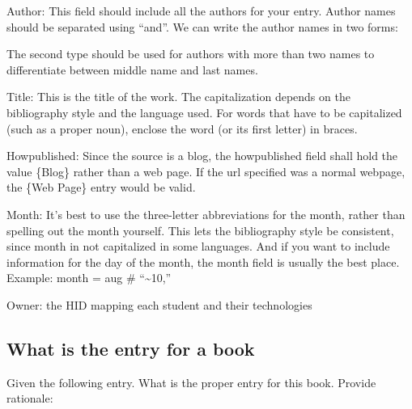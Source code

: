 Author:
This field should include all the authors for your entry. Author names
should be separated using “and”. We can write the author names in two
forms:

\begin{sphinxVerbatim}[commandchars=\\\{\}]
       
                
       
                
\end{sphinxVerbatim}

The second type should be used for authors with more than two names to
differentiate between middle name and last names.

Title: This is the title of the work. The capitalization depends on
the bibliography style and the language used. For words that have to
be capitalized (such as a proper noun), enclose the word (or its first
letter) in braces.

Howpublished: Since the source is a blog, the howpublished field shall
hold the value \{Blog\} rather than a web page. If the url specified was
a normal webpage, the \{Web Page\} entry would be valid.

Month: It's best to use the three-letter abbreviations for the month,
rather than spelling out the month yourself. This lets the
bibliography style be consistent, since month in not capitalized in
some languages. And if you want to include information for the day of
the month, the month field is usually the best place. Example: month =
aug \# ``\textasciitilde{}10,''

Owner: the HID mapping each student and their technologies


\subsection{What is the entry for a book}
\label{\detokenize{lesson/doc/bibtex-7:what-is-the-entry-for-a-book}}\label{\detokenize{lesson/doc/bibtex-7::doc}}
Given the following entry. What is the proper entry for this book.
Provide rationale:

